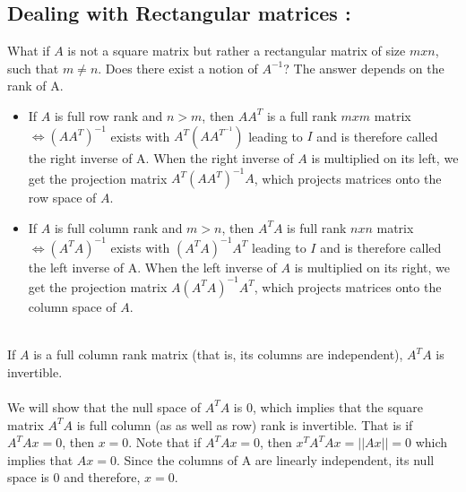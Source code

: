 \documentclass[12pt]{article}
\begin{document}
\subsection{Dealing with Rectangular matrices :}
What if $A$ is not a square matrix but rather a rectangular matrix of size $m x n$, such that $m \neq n$. Does there exist a notion of $A^{-1}$? The answer depends on the rank of A.
\begin{itemize}
    \item If $A$ is full row rank and $n > m$, then $AA^{T}$ is a full rank $m x m$ matrix $\Longleftrightarrow (AA^{T})^{-1}$ exists with $A^{T}(AA^{T}^{-1})$ leading to $I$ and is therefore called the right inverse of A. When the right inverse of $A$ is multiplied on its left, we get the projection matrix $A^{T}(AA^{T})^{-1}A$, which projects matrices onto the row space of $A$.
    \item If $A$ is full column rank and $m > n$, then $A^{T}A$ is full rank $n x n$ matrix $\Longleftrightarrow (A^{T}A)^{-1}$ exists with $(A^{T}A)^{-1}A^{T}$ leading to $I$ and is therefore called the left inverse of A. When the left inverse of $A$ is multiplied on its right, we get the projection matrix $A(A^{T}A)^{-1}A^{T}$, which projects matrices onto the column space of $A$.
\end{itemize}
\\
If $A$ is a full column rank matrix (that is, its columns are independent), $A^{T}A$ is invertible.
\\\\
We will show that the null space of $A^{T}A$ is ${0}$, which implies that the square matrix $A^{T}A$ is full column (as as well as row) rank is invertible. That is if $A^{T}Ax = 0$, then $x = 0$. Note that if $A^{T}Ax = 0$, then $x^{T}A^{T}Ax = ||Ax|| = 0$ which implies that $Ax = 0$. Since the columns of A are linearly independent, its null space is 0 and therefore, $x = 0$.
%


\end{document}

